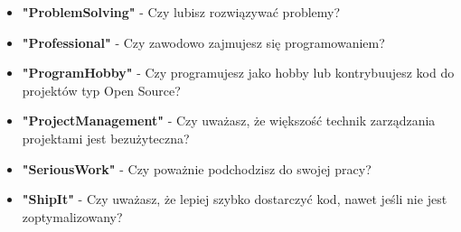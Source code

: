 \begin{appendices}
\begin{itemize}
        \item \textbf{"ProblemSolving"} - Czy lubisz rozwiązywać problemy?
        \item \textbf{"Professional"} - Czy zawodowo zajmujesz się programowaniem?
        \item \textbf{"ProgramHobby"} - Czy programujesz jako hobby lub kontrybuujesz kod do projektów typ Open Source?
        \item \textbf{"ProjectManagement"} - Czy uważasz, że większość technik zarządzania projektami jest bezużyteczna?
        \item \textbf{"SeriousWork"} - Czy poważnie podchodzisz do swojej pracy?
        \item \textbf{"ShipIt"} - Czy uważasz, że lepiej szybko dostarczyć kod, nawet jeśli nie jest zoptymalizowany?

\end{itemize}
\end{appendices}
